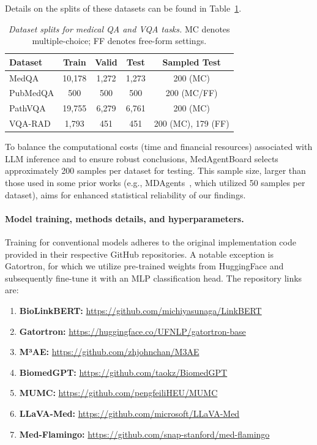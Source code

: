 \documentclass{article}
\begin{document}
Details on the splits of these datasets can be found in Table~\ref{tab:datasets_split_medqa_appendix}.

\begin{table}[!ht]
\centering
\footnotesize
\caption{\textit{Dataset splits for medical QA and VQA tasks.} MC denotes multiple-choice; FF denotes free-form settings.}
\label{tab:datasets_split_medqa_appendix}
\begin{tabular}{lcccc}
\toprule
\textbf{Dataset}       & \textbf{Train}  & \textbf{Valid} & \textbf{Test} & \textbf{Sampled Test}  \\
\midrule
MedQA         & 10,178 & 1,272     & 1,273 & 200 (MC) \\
PubMedQA      & 500    & 500       & 500   & 200 (MC/FF) \\
PathVQA       & 19,755 & 6,279     & 6,761  & 200 (MC) \\
VQA-RAD       & 1,793  & 451       & 451 & 200 (MC), 179 (FF)  \\
\bottomrule
\end{tabular}
\end{table}

To balance the computational costs (time and financial resources) associated with LLM inference and to ensure robust conclusions, MedAgentBoard selects approximately 200 samples per dataset for testing. This sample size, larger than those used in some prior works (e.g., MDAgents~\cite{kim2024mdagents}, which utilized 50 samples per dataset), aims for enhanced statistical reliability of our findings.

\paragraph{Model training, methods details, and hyperparameters.}
\label{sec:app_task1_models_hyperparams}
Training for conventional models adheres to the original implementation code provided in their respective GitHub repositories. A notable exception is Gatortron, for which we utilize pre-trained weights from HuggingFace and subsequently fine-tune it with an MLP classification head. The repository links are:
\begin{enumerate}
    \item\textbf{BioLinkBERT:} \url{https://github.com/michiyasunaga/LinkBERT}
    \item\textbf{Gatortron:} \url{https://huggingface.co/UFNLP/gatortron-base}
    \item\textbf{M³AE:} \url{https://github.com/zhjohnchan/M3AE}
    \item\textbf{BiomedGPT:} \url{https://github.com/taokz/BiomedGPT}
    \item\textbf{MUMC:} \url{https://github.com/pengfeiliHEU/MUMC}
    \item\textbf{LLaVA-Med:} \url{https://github.com/microsoft/LLaVA-Med}
    \item\textbf{Med-Flamingo:} \url{https://github.com/snap-stanford/med-flamingo}
\end{enumerate}
\end{document}
